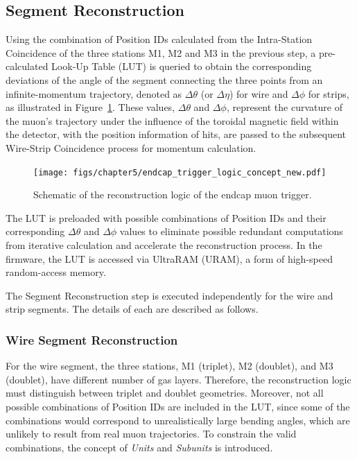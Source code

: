 \subsection{Segment Reconstruction} \label{subsec:SegRec}
Using the combination of Position IDs calculated from the Intra-Station Coincidence of the three stations M1, M2 and M3 in the previous step, a pre-calculated Look-Up Table (LUT) is queried to obtain the corresponding deviations of the angle of the segment connecting the three points from an infinite-momentum trajectory, denoted as $\Delta\theta$ (or $\Delta\eta$) for wire and $\Delta\phi$ for strips, as illustrated in Figure~\ref{fig:EndcapTriggerLogic}. These values, $\Delta\theta$ and $\Delta\phi$, represent the curvature of the muon’s trajectory under the influence of the toroidal magnetic field within the detector, with the position information of hits, are passed to the subsequent Wire-Strip Coincidence process for momentum calculation.

\begin{figure}[htbp]
  \centering
  \texttt{[image: figs/chapter5/endcap\_trigger\_logic\_concept\_new.pdf]}
  \caption{Schematic of the reconstruction logic of the endcap muon trigger.}
  \label{fig:EndcapTriggerLogic}
\end{figure}

The LUT is preloaded with possible combinations of Position IDs and their corresponding $\Delta\theta$ and $\Delta\phi$ values to eliminate possible redundant computations from iterative calculation and accelerate the reconstruction process. In the firmware, the LUT is accessed via UltraRAM (URAM), a form of high-speed random-access memory.

The Segment Reconstruction step is executed independently for the wire and strip segments. The details of each are described as follows.

\subsubsection{Wire Segment Reconstruction}

For the wire segment, the three stations, M1 (triplet), M2 (doublet), and M3 (doublet), have different number of gas layers. Therefore, the reconstruction logic must distinguish between triplet and doublet geometries. Moreover, not all possible combinations of Position IDs are included in the LUT, since some of the combinations would correspond to unrealistically large bending angles, which are unlikely to result from real muon trajectories. To constrain the valid combinations, the concept of \textit{Units} and \textit{Subunits} is introduced.

